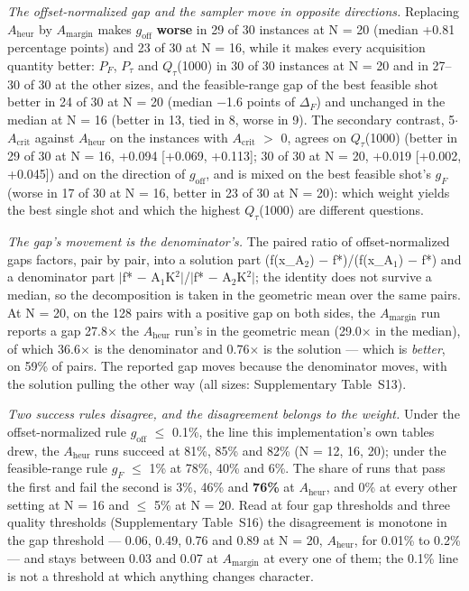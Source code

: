 \documentclass{ieeeaccess}
\begin{document}
\textit{The offset-normalized gap and the sampler move in opposite directions.} Replacing $A_{\mathrm{heur}}$ by $A_{\mathrm{margin}}$ makes $g_{\mathrm{off}}$ \textbf{worse} in 29 of 30 instances at N = 20 (median +0.81 percentage points) and 23 of 30 at N = 16, while it makes every acquisition quantity better: $P_{F}$, $P_{\tau}$ and $Q_{\tau}$(1000) in 30 of 30 instances at N = 20 and in 27--30 of 30 at the other sizes, and the feasible-range gap of the best feasible shot better in 24 of 30 at N = 20 (median $-$1.6 points of $\Delta_{F}$) and unchanged in the median at N = 16 (better in 13, tied in 8, worse in 9). The secondary contrast, 5$\cdot$$A_{\mathrm{crit}}$ against $A_{\mathrm{heur}}$ on the instances with $A_{\mathrm{crit}}$ $>$ 0, agrees on $Q_{\tau}$(1000) (better in 29 of 30 at N = 16, +0.094 [+0.069, +0.113]; 30 of 30 at N = 20, +0.019 [+0.002, +0.045]) and on the direction of $g_{\mathrm{off}}$, and is mixed on the best feasible shot's $g_{F}$ (worse in 17 of 30 at N = 16, better in 23 of 30 at N = 20): which weight yields the best single shot and which the highest $Q_{\tau}$(1000) are different questions.


\textit{The gap's movement is the denominator's.} The paired ratio of offset-normalized gaps factors, pair by pair, into a solution part (f(x\_A$_2$) $-$ f*)/(f(x\_A$_1$) $-$ f*) and a denominator part $|$f* $-$ A$_1$K$^{2}$$|$/$|$f* $-$ A$_2$K$^{2}$$|$; the identity does not survive a median, so the decomposition is taken in the geometric mean over the same pairs. At N = 20, on the 128 pairs with a positive gap on both sides, the $A_{\mathrm{margin}}$ run reports a gap 27.8$\times$ the $A_{\mathrm{heur}}$ run's in the geometric mean (29.0$\times$ in the median), of which 36.6$\times$ is the denominator and 0.76$\times$ is the solution --- which is \textit{better}, on 59\% of pairs. The reported gap moves because the denominator moves, with the solution pulling the other way (all sizes: Supplementary Table~S13).


\textit{Two success rules disagree, and the disagreement belongs to the weight.} Under the offset-normalized rule $g_{\mathrm{off}}$ $\leq$ 0.1\%, the line this implementation's own tables drew, the $A_{\mathrm{heur}}$ runs succeed at 81\%, 85\% and 82\% (N = 12, 16, 20); under the feasible-range rule $g_{F}$ $\leq$ 1\% at 78\%, 40\% and 6\%. The share of runs that pass the first and fail the second is 3\%, 46\% and \textbf{76\%} at $A_{\mathrm{heur}}$, and 0\% at every other setting at N = 16 and $\leq$ 5\% at N = 20. Read at four gap thresholds and three quality thresholds (Supplementary Table~S16) the disagreement is monotone in the gap threshold --- 0.06, 0.49, 0.76 and 0.89 at N = 20, $A_{\mathrm{heur}}$, for 0.01\% to 0.2\% --- and stays between 0.03 and 0.07 at $A_{\mathrm{margin}}$ at every one of them; the 0.1\% line is not a threshold at which anything changes character.
\end{document}
